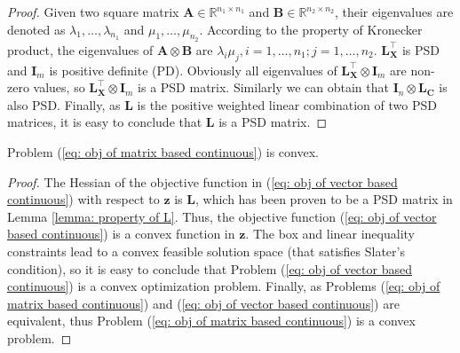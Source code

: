 \documentclass[twocolumn]{svjour3}          %
\newcommand{\z}{\mathbf{z}}
\newcommand{\C}{\mathbf{C}}
\newcommand{\X}{\mathbf{X}}
\begin{document}
\begin{proof}
Given two square matrix $\mathbf{A} \in \mathbb{R}^{n_1 \times n_1}$ and $\mathbf{B} \in \mathbb{R}^{n_2 \times n_2}$, their eigenvalues are denoted as $\lambda_1,\ldots,\lambda_{n_1}$ and $\mu_1,\ldots,\mu_{n_2}$.
According to the property of Kronecker product, the eigenvalues of $\mathbf{A} \otimes \textbf{B}$ are $\lambda_i \mu_j, i=1,\ldots,n_1; j = 1,\ldots,n_2$.
%
 $\mathbf{L}_\X^\top$ is PSD and $\mathbf{I}_m$ is positive definite (PD). Obviously all eigenvalues of $\mathbf{L}_\X^\top \otimes \mathbf{I}_m$ are non-zero values, so $\mathbf{L}_\X^\top \otimes \mathbf{I}_m$ is a PSD matrix. Similarly we can obtain that $\mathbf{I}_n \otimes \mathbf{L}_\C$ is also PSD. Finally, as $\mathbf{L}$ is the positive weighted linear combination of two PSD matrices, it is easy to conclude that $\mathbf{L}$ is a PSD matrix.
\end{proof}



\begin{proposition}
 Problem (\ref{eq: obj of matrix based continuous}) is convex.  
\label{proposition: proof of convexity}
\end{proposition}

\begin{proof}
The Hessian of the objective function in (\ref{eq: obj of vector based continuous}) with respect to $\z$ is $\mathbf{L}$, which has been proven to be a PSD matrix in Lemma \ref{lemma: property of L}. Thus, the objective function (\ref{eq: obj of vector based continuous}) is a convex function in $\z$.
The box and linear inequality constraints lead to a convex feasible solution space (that satisfies Slater's condition), so it is easy to conclude that Problem (\ref{eq: obj of vector based continuous}) is a convex optimization problem. Finally, as Problems (\ref{eq: obj of matrix based continuous}) and (\ref{eq: obj of vector based continuous}) are equivalent, thus Problem (\ref{eq: obj of matrix based continuous}) is a convex problem.
\end{proof}


\end{document}
